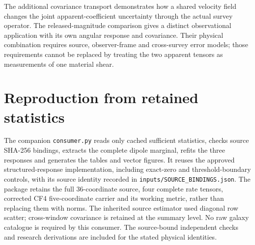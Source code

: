 \documentclass[aps,prd,reprint,onecolumn,superscriptaddress,nofootinbib]{revtex4-2}
\begin{document}
\appendix
The additional covariance transport demonstrates how a shared velocity
field changes the joint apparent-coefficient uncertainty through the
actual survey operator. The released-magnitude comparison gives a
distinct observational application with its own angular response and
covariance. Their physical combination requires source, observer-frame
and cross-survey error models; those requirements cannot be replaced by
treating the two apparent tensors as measurements of one material shear.

\section{Reproduction from retained statistics}
The companion \texttt{consumer.py} reads only cached sufficient statistics, checks source SHA-256 bindings, extracts the complete dipole marginal, refits the three responses and generates the tables and vector figures. It reuses the approved structured-response implementation, including exact-zero and threshold-boundary controls, with its source identity recorded in \texttt{inputs/SOURCE\_BINDINGS.json}. The package retains the full 36-coordinate source, four complete rate tensors, corrected CF4 five-coordinate carrier and its working metric, rather than replacing them with norms. The inherited source estimator used diagonal row scatter; cross-window covariance is retained at the summary level. No raw galaxy catalogue is required by this consumer. The source-bound independent checks and research derivations are included for the stated physical identities.


\end{document}
